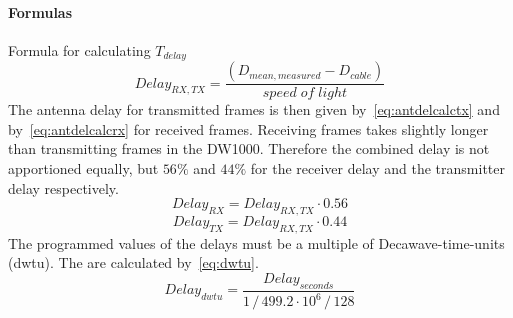 \documentclass[journal,comsoc]{IEEEtran}
\begin{document}
\paragraph{Formulas}
Formula for calculating $T_{delay}$
\begin{equation}
\label{eq:antennadelay}
Delay_{RX,TX} = \frac{\left( D_{mean,measured} - D_{cable} \right)}{speed\;of\;light}
\end{equation}
The antenna delay for transmitted frames is then given by~\eqref{eq:antdelcalctx} and by~\eqref{eq:antdelcalcrx} for received frames.
Receiving frames takes slightly longer than transmitting frames in the DW1000.
Therefore the combined delay is not apportioned equally, but $56\%$ and $44\%$ for the receiver delay and the transmitter delay respectively. 
\begin{equation}
\label{eq:antdelcalctx}
Delay_{RX} = Delay_{RX,TX} \cdot 0.56
\end{equation}
\begin{equation}
\label{eq:antdelcalcrx}
Delay_{TX} = Delay_{RX,TX} \cdot 0.44
\end{equation}
The programmed values of the delays must be a multiple of Decawave-time-units (dwtu).
The are calculated by~\eqref{eq:dwtu}.
\begin{equation}
\label{eq:dwtu}
Delay_{dwtu} = \frac{Delay_{seconds}}{1\,/\,499.2\cdot10^6 \,/\,128}
\end{equation}

\onecolumn
\newpage
\end{document}
